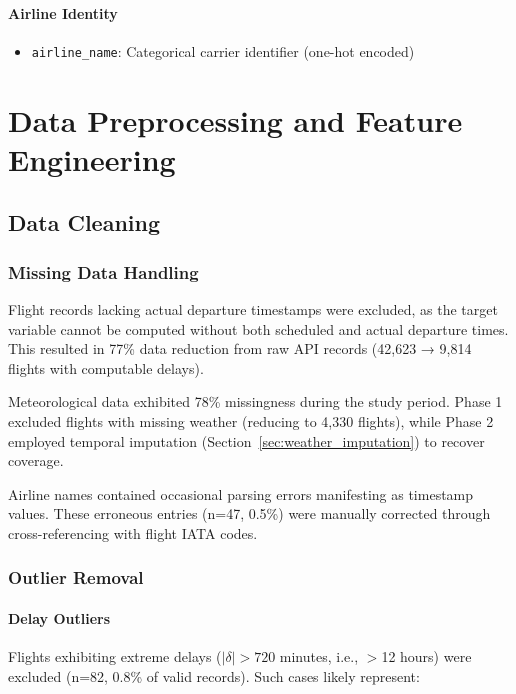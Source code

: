 \documentclass{report}
\begin{document}
\paragraph{Airline Identity}
\begin{itemize}
    \item \texttt{airline\_name}: Categorical carrier identifier (one-hot encoded)
\end{itemize}

\section{Data Preprocessing and Feature Engineering}
\label{sec:preprocessing}

\subsection{Data Cleaning}
\label{sec:data_cleaning}

\subsubsection{Missing Data Handling}

Flight records lacking actual departure timestamps were excluded, as the target variable cannot be computed without both scheduled and actual departure times. This resulted in 77\% data reduction from raw API records (42,623 → 9,814 flights with computable delays).

Meteorological data exhibited 78\% missingness during the study period. Phase 1 excluded flights with missing weather (reducing to 4,330 flights), while Phase 2 employed temporal imputation (Section~\ref{sec:weather_imputation}) to recover coverage.

Airline names contained occasional parsing errors manifesting as timestamp values. These erroneous entries (n=47, 0.5\%) were manually corrected through cross-referencing with flight IATA codes.

\subsubsection{Outlier Removal}

\paragraph{Delay Outliers}

Flights exhibiting extreme delays ($|\delta| > 720$ minutes, i.e., $>$12 hours) were excluded (n=82, 0.8\% of valid records). Such cases likely represent:
\end{document}
